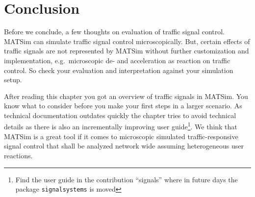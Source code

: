 \section{Conclusion} %
\label{sec:signals_evaluation_conclusion}

Before we conclude, a few thoughts on evaluation of traffic signal control. 
MATSim can simulate traffic signal control microscopically. 
But, certain effects of traffic signals are not represented by MATSim without further customization and implementation, e.g.~microscopic de- and acceleration as reaction on traffic control. 
So check your evaluation and interpretation against your simulation setup. 

After reading this chapter you got an overview of traffic signals in MATSim. 
You know what to consider before you make your first steps in a larger scenario. 
As technical documentation outdates quickly the chapter tries to avoid technical details as there is also an incrementally improving user guide\footnote{Find the user guide  in the contribution ``signals'' where in future days the package \lstinline|signalsystems| is moved }.  
We think that MATSim is a great tool if it comes to microscopic simulated traffic-responsive signal control that shall be analyzed network wide assuming heterogeneous user reactions. 


